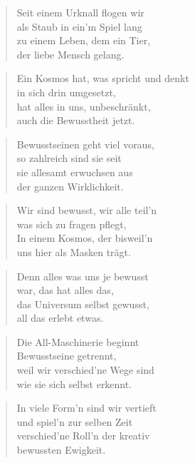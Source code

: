 \documentclass[10pt,a4paper]{article}
\begin{document}
\begin{multicols}{2}
\begin{verse}
Seit einem Urknall flogen wir \\
als Staub in ein’m Spiel lang \\
zu einem Leben, dem ein Tier, \\
der liebe Mensch gelang. \\
\end{verse}

\begin{verse}
Ein Kosmos hat, was spricht und denkt \\
in sich drin umgesetzt, \\
hat alles in uns, unbeschränkt, \\
auch die Bewusstheit jetzt. \\
\end{verse}

\begin{verse}
Bewusstseinen geht viel voraus, \\
so zahlreich sind sie seit \\
sie allesamt erwuchsen aus \\
der ganzen Wirklichkeit. \\
\end{verse}

\begin{verse}
Wir sind bewusst, wir alle teil’n \\
was sich zu fragen pflegt, \\
In einem Kosmos, der bisweil’n \\
uns hier als Masken trägt. \\
\end{verse}

\begin{verse}
Denn alles was uns je bewusst \\
war, das hat alles das, \\
das Universum selbst gewusst, \\
all das erlebt etwas. \\
\end{verse}

\begin{verse}
Die All-Maschinerie beginnt \\
Bewusstseine getrennt, \\
weil wir verschied’ne Wege sind \\
wie sie sich selbst erkennt. \\
\end{verse}

\begin{verse}
In viele Form’n sind wir vertieft \\
und spiel’n zur selben Zeit \\
verschied’ne Roll’n der kreativ \\
bewussten Ewigkeit. \\
\end{verse}


\end{multicols}
\end{document}
